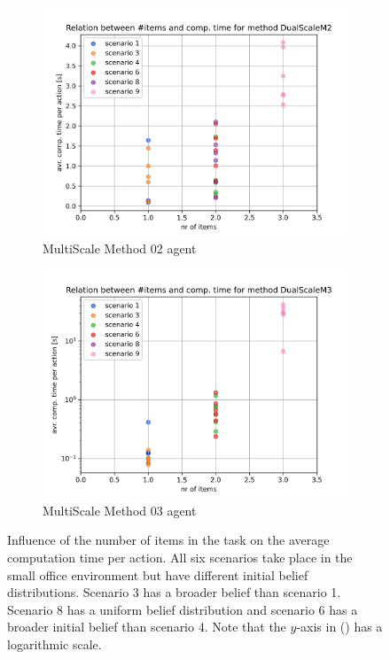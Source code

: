 \begin{figure}
\begin{subfigure}[b]{0.49\textwidth}
        \includegraphics[width=\textwidth]{Report/images/nr_of_items/items_vs_comptime_DualScaleM2.png}
        \caption{MultiScale Method 02 agent}
        \label{subfig:nr_of_items_D2}
    \end{subfigure}
    \hfill
    \begin{subfigure}[b]{0.49\textwidth}
         \includegraphics[width=\textwidth]{Report/images/nr_of_items/items_vs_comptime_DualScaleM3.png}
        \caption{MultiScale Method 03 agent}
        \label{subfig:nr_of_items_D3}
    \end{subfigure}
     \caption{Influence of the number of items in the task on the average computation time per action. All six scenarios take place in the small office environment but have different initial belief distributions. Scenario 3 has a broader belief than scenario 1. Scenario 8 has a uniform belief distribution and scenario 6 has a broader initial belief than scenario 4. Note that the $y$-axis in () has a logarithmic scale. }
    \label{fig:nr_of_items}
\end{figure}

